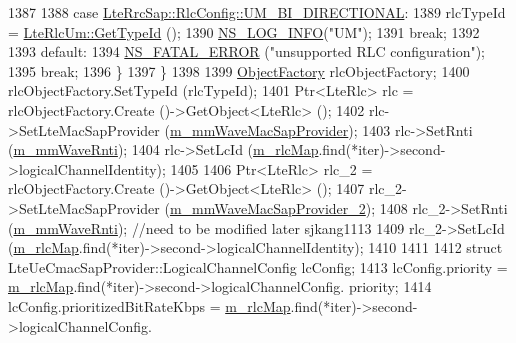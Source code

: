 \begin{DoxyCode}
1387           
1388                 \textcolor{keywordflow}{case} \hyperlink{structns3_1_1LteRrcSap_1_1RlcConfig_ab6ab94ca4abaf717926f31db4dddc61ba55368feac1627138969235809e6eedc5}{LteRrcSap::RlcConfig::UM\_BI\_DIRECTIONAL}: 
1389                   rlcTypeId = \hyperlink{classns3_1_1LteRlcUm_a119b2b1273c42483a050896d5232829d}{LteRlcUm::GetTypeId} ();
1390                   \hyperlink{group__logging_gafbd73ee2cf9f26b319f49086d8e860fb}{NS\_LOG\_INFO}(\textcolor{stringliteral}{"UM"});
1391                   \textcolor{keywordflow}{break};
1392           
1393                 \textcolor{keywordflow}{default}:
1394                   \hyperlink{group__fatal_ga5131d5e3f75d7d4cbfd706ac456fdc85}{NS\_FATAL\_ERROR} (\textcolor{stringliteral}{"unsupported RLC configuration"});
1395                   \textcolor{keywordflow}{break};                
1396                 \}
1397             \}
1398   
1399           \hyperlink{classns3_1_1Object_a2810e70b8c8377aa8617138fc0f65e92}{ObjectFactory} rlcObjectFactory;
1400           rlcObjectFactory.SetTypeId (rlcTypeId);
1401           Ptr<LteRlc> rlc = rlcObjectFactory.Create ()->GetObject<LteRlc> ();
1402           rlc->SetLteMacSapProvider (\hyperlink{classns3_1_1LteUeRrc_ace6035d94d2a6fb838f107450d49b373}{m\_mmWaveMacSapProvider}); 
1403           rlc->SetRnti (\hyperlink{classns3_1_1LteUeRrc_a0bd0d5c3b49624be1fd217f96910f56a}{m\_mmWaveRnti});
1404           rlc->SetLcId (\hyperlink{classns3_1_1LteUeRrc_a64b3948cda818827b8774d7a2be7ea4f}{m\_rlcMap}.find(*iter)->second->logicalChannelIdentity);
1405 
1406           Ptr<LteRlc> rlc\_2 = rlcObjectFactory.Create ()->GetObject<LteRlc> ();
1407            rlc\_2->SetLteMacSapProvider (\hyperlink{classns3_1_1LteUeRrc_a0df418b8b1c9be4267f5b56d904ba841}{m\_mmWaveMacSapProvider\_2});
1408                     rlc\_2->SetRnti (\hyperlink{classns3_1_1LteUeRrc_a0bd0d5c3b49624be1fd217f96910f56a}{m\_mmWaveRnti}); \textcolor{comment}{//need to be modified later sjkang1113}
1409                     rlc\_2->SetLcId (\hyperlink{classns3_1_1LteUeRrc_a64b3948cda818827b8774d7a2be7ea4f}{m\_rlcMap}.find(*iter)->second->logicalChannelIdentity);
1410 
1411 
1412           \textcolor{keyword}{struct }LteUeCmacSapProvider::LogicalChannelConfig lcConfig;
1413           lcConfig.priority =               \hyperlink{classns3_1_1LteUeRrc_a64b3948cda818827b8774d7a2be7ea4f}{m\_rlcMap}.find(*iter)->second->logicalChannelConfig.
      priority;
1414           lcConfig.prioritizedBitRateKbps = \hyperlink{classns3_1_1LteUeRrc_a64b3948cda818827b8774d7a2be7ea4f}{m\_rlcMap}.find(*iter)->second->logicalChannelConfig.

\end{DoxyCode}

